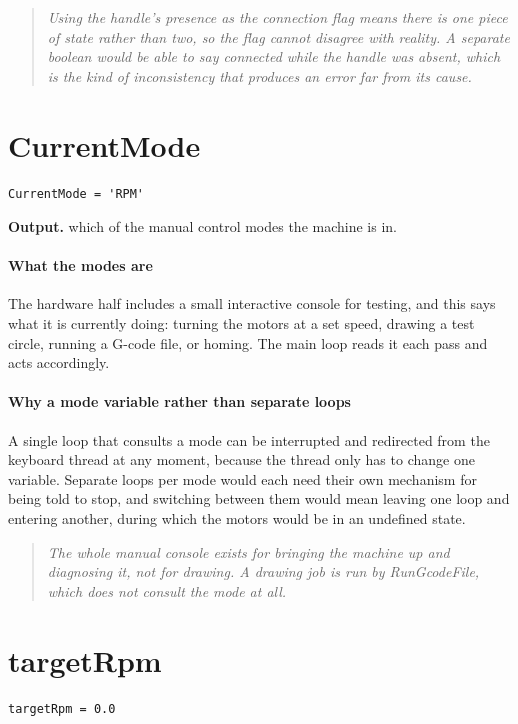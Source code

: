 \begin{quote}\small\itshape Using the handle's presence as the connection flag means there is one piece of state rather than two, so the flag cannot disagree with reality. A separate boolean would be able to say connected while the handle was absent, which is the kind of inconsistency that produces an error far from its cause.\end{quote}

\section{CurrentMode}
\begin{lstlisting}[style=sig]
CurrentMode = 'RPM'
\end{lstlisting}

\noindent\textbf{Output.} which of the manual control modes the machine is in.


\paragraph{What the modes are}
The hardware half includes a small interactive console for testing, and this says what it is currently doing: turning the motors at a set speed, drawing a test circle, running a G-code file, or homing. The main loop reads it each pass and acts accordingly.


\paragraph{Why a mode variable rather than separate loops}
A single loop that consults a mode can be interrupted and redirected from the keyboard thread at any moment, because the thread only has to change one variable. Separate loops per mode would each need their own mechanism for being told to stop, and switching between them would mean leaving one loop and entering another, during which the motors would be in an undefined state.


\begin{quote}\small\itshape The whole manual console exists for bringing the machine up and diagnosing it, not for drawing. A drawing job is run by RunGcodeFile, which does not consult the mode at all.\end{quote}

\section{targetRpm}
\begin{lstlisting}[style=sig]
targetRpm = 0.0
\end{lstlisting}

